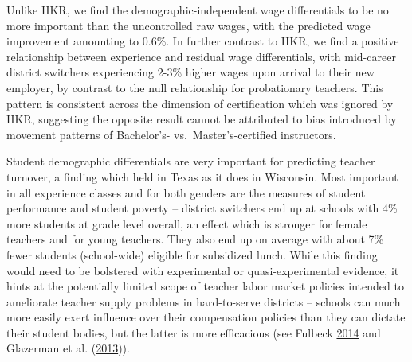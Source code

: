 \documentclass[12pt,]{article}
\begin{document}
Unlike HKR, we find the demographic-independent wage differentials to be
no more important than the uncontrolled raw wages, with the predicted
wage improvement amounting to 0.6\%. In further contrast to HKR, we find
a positive relationship between experience and residual wage
differentials, with mid-career district switchers experiencing 2-3\%
higher wages upon arrival to their new employer, by contrast to the null
relationship for probationary teachers. This pattern is consistent
across the dimension of certification which was ignored by HKR,
suggesting the opposite result cannot be attributed to bias introduced
by movement patterns of Bachelor's- vs.~Master's-certified instructors.

Student demographic differentials are very important for predicting
teacher turnover, a finding which held in Texas as it does in Wisconsin.
Most important in all experience classes and for both genders are the
measures of student performance and student poverty -- district
switchers end up at schools with 4\% more students at grade level
overall, an effect which is stronger for female teachers and for young
teachers. They also end up on average with about 7\% fewer students
(school-wide) eligible for subsidized lunch. While this finding would
need to be bolstered with experimental or quasi-experimental evidence,
it hints at the potentially limited scope of teacher labor market
policies intended to ameliorate teacher supply problems in hard-to-serve
districts -- schools can much more easily exert influence over their
compensation policies than they can dictate their student bodies, but
the latter is more efficacious (see Fulbeck
\protect\hyperlink{ref-fulbeck}{2014} and Glazerman et al.
(\protect\hyperlink{ref-glazerman}{2013})).
\end{document}
